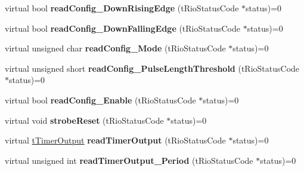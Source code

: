 \begin{DoxyCompactItemize}
\item 
\hypertarget{classnFPGA_1_1nFRC__2012__1__6__4_1_1tCounter_a33c846102a571aa72fe35418099147ef}{
virtual bool {\bfseries readConfig\_\-DownRisingEdge} (tRioStatusCode $\ast$status)=0}
\label{classnFPGA_1_1nFRC__2012__1__6__4_1_1tCounter_a33c846102a571aa72fe35418099147ef}

\item 
\hypertarget{classnFPGA_1_1nFRC__2012__1__6__4_1_1tCounter_af9ac2a88682356fd9b574961d634a646}{
virtual bool {\bfseries readConfig\_\-DownFallingEdge} (tRioStatusCode $\ast$status)=0}
\label{classnFPGA_1_1nFRC__2012__1__6__4_1_1tCounter_af9ac2a88682356fd9b574961d634a646}

\item 
\hypertarget{classnFPGA_1_1nFRC__2012__1__6__4_1_1tCounter_ac9e64d4c8377c82751c23480938ae615}{
virtual unsigned char {\bfseries readConfig\_\-Mode} (tRioStatusCode $\ast$status)=0}
\label{classnFPGA_1_1nFRC__2012__1__6__4_1_1tCounter_ac9e64d4c8377c82751c23480938ae615}

\item 
\hypertarget{classnFPGA_1_1nFRC__2012__1__6__4_1_1tCounter_a9aa3d8c09d4a2f9f25574711d77bbf0f}{
virtual unsigned short {\bfseries readConfig\_\-PulseLengthThreshold} (tRioStatusCode $\ast$status)=0}
\label{classnFPGA_1_1nFRC__2012__1__6__4_1_1tCounter_a9aa3d8c09d4a2f9f25574711d77bbf0f}

\item 
\hypertarget{classnFPGA_1_1nFRC__2012__1__6__4_1_1tCounter_a08242043cfde766f578e9c58998a4f5a}{
virtual bool {\bfseries readConfig\_\-Enable} (tRioStatusCode $\ast$status)=0}
\label{classnFPGA_1_1nFRC__2012__1__6__4_1_1tCounter_a08242043cfde766f578e9c58998a4f5a}

\item 
\hypertarget{classnFPGA_1_1nFRC__2012__1__6__4_1_1tCounter_acdc4b46b62200bf8fb40b159afc5ad79}{
virtual void {\bfseries strobeReset} (tRioStatusCode $\ast$status)=0}
\label{classnFPGA_1_1nFRC__2012__1__6__4_1_1tCounter_acdc4b46b62200bf8fb40b159afc5ad79}

\item 
\hypertarget{classnFPGA_1_1nFRC__2012__1__6__4_1_1tCounter_abea3ab2b29e94e619aca238d87609aa6}{
virtual \hyperlink{unionnFPGA_1_1nFRC__2012__1__6__4_1_1tCounter_1_1tTimerOutput}{tTimerOutput} {\bfseries readTimerOutput} (tRioStatusCode $\ast$status)=0}
\label{classnFPGA_1_1nFRC__2012__1__6__4_1_1tCounter_abea3ab2b29e94e619aca238d87609aa6}

\item 
\hypertarget{classnFPGA_1_1nFRC__2012__1__6__4_1_1tCounter_a990a382a447e36013ed42db0a995059e}{
virtual unsigned int {\bfseries readTimerOutput\_\-Period} (tRioStatusCode $\ast$status)=0}
\label{classnFPGA_1_1nFRC__2012__1__6__4_1_1tCounter_a990a382a447e36013ed42db0a995059e}


\end{DoxyCompactItemize}
